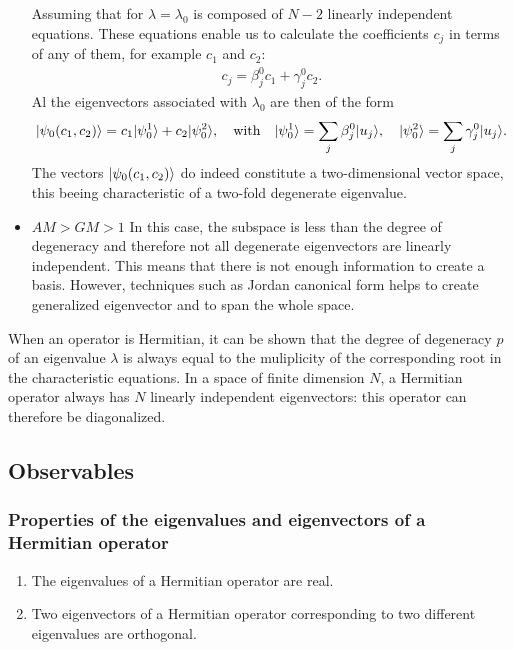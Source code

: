 \begin{itemize}
    Assuming that for $\lambda=\lambda_0$ is composed of $N-2$ linearly independent equations. These equations enable us to calculate the coefficients
    $c_j$ in terms of any of them, for example $c_1$ and $c_2$: 
    \begin{align*}
        c_j=\beta_j^0c_1+\gamma_j^0c_2.
    \end{align*} 
    Al the eigenvectors associated with $\lambda_0$ are then of the form
    \begin{align}
        |\psi_0(c_1,c_2)\rangle=c_1|\psi_0^1\rangle+c_2|\psi_0^2\rangle,\quad\text{with}\quad |\psi_0^1\rangle=\sum_j\beta_j^0|u_j\rangle,\quad|\psi_0^2\rangle=\sum_j\gamma_j^0|u_j\rangle.
    \end{align}
    The vectors $|\psi_0(c_1,c_2)\rangle$ do indeed constitute a two-dimensional vector space, this beeing characteristic of a two-fold degenerate eigenvalue.
    \item\textbf{$AM>GM>1$} In this case, the subspace is less than the degree of degeneracy and therefore not all degenerate eigenvectors are linearly independent. This means that 
    there is not enough information to create a basis. However, techniques such as Jordan canonical form helps to create generalized eigenvector and to span the whole space.
\end{itemize}
\begin{emphasizer}
    When an operator is Hermitian, it can be shown that the degree of degeneracy $p$ of an eigenvalue $\lambda$ is always equal to the muliplicity of the corresponding root in 
    the characteristic equations.
    In a space of finite dimension $N$, a Hermitian operator always has $N$ linearly independent eigenvectors: this operator can therefore be diagonalized.
\end{emphasizer}

\subsection{Observables}
\subsubsection{Properties of the eigenvalues and eigenvectors of a Hermitian operator}
\begin{enumerate}[itemsep=0pt,topsep=0pt,label=\roman*)]
    \item The eigenvalues of a Hermitian operator are real.
    \item Two eigenvectors of a Hermitian operator corresponding to two different eigenvalues are orthogonal.
\end{enumerate}
